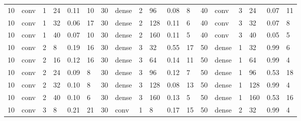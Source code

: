 \begin{table}
{\begin{tabular}{@{}llllll|llllll|llllll@{}}
10          & conv       & 1          & 24         & 0.11         & 10           & 30          & dense      & 2          & 96         & 0.08         & 8            & 40          & conv       & 3          & 24         & 0.07         & 11           \\
10          & conv       & 1          & 32         & 0.06         & 17           & 30          & dense      & 2          & 128        & 0.11         & 6            & 40          & conv       & 3          & 32         & 0.07         & 8            \\
10          & conv       & 1          & 40         & 0.07         & 10           & 30          & dense      & 2          & 160        & 0.11         & 5            & 40          & conv       & 3          & 40         & 0.05         & 5            \\
10          & conv       & 2          & 8          & 0.19         & 16           & 30          & dense      & 3          & 32         & 0.55         & 17           & 50          & dense      & 1          & 32         & 0.99         & 6            \\
10          & conv       & 2          & 16         & 0.12         & 16           & 30          & dense      & 3          & 64         & 0.14         & 11           & 50          & dense      & 1          & 64         & 0.99         & 4            \\
10          & conv       & 2          & 24         & 0.09         & 8            & 30          & dense      & 3          & 96         & 0.12         & 7            & 50          & dense      & 1          & 96         & 0.53         & 18           \\
10          & conv       & 2          & 32         & 0.10         & 8            & 30          & dense      & 3          & 128        & 0.08         & 13           & 50          & dense      & 1          & 128        & 0.99         & 4            \\
10          & conv       & 2          & 40         & 0.10         & 6            & 30          & dense      & 3          & 160        & 0.13         & 5            & 50          & dense      & 1          & 160        & 0.53         & 16           \\
10          & conv       & 3          & 8          & 0.21         & 21           & 30          & conv       & 1          & 8          & 0.17         & 15           & 50          & dense      & 2          & 32         & 0.99         & 4            \\

\end{tabular}}
\end{table}
